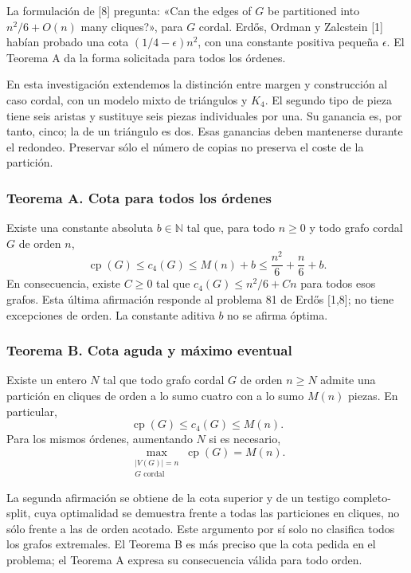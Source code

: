 \documentclass[spanish,11pt,a4paper]{article}
\begin{document}
La formulación de {[}8{]} pregunta: «Can the edges of \(G\) be partitioned into \(n^2/6+O(n)\) many cliques?», para \(G\) cordal. Erdős, Ordman y Zalcstein {[}1{]} habían probado una cota \((1/4-\epsilon)n^2\), con una constante positiva pequeña \(\epsilon\). El Teorema A da la forma solicitada para todos los órdenes.

En esta investigación extendemos la distinción entre margen y construcción al caso cordal, con un modelo mixto de triángulos y \(K_4\). El segundo tipo de pieza tiene seis aristas y sustituye seis piezas individuales por una. Su ganancia es, por tanto, cinco; la de un triángulo es dos. Esas ganancias deben mantenerse durante el redondeo. Preservar sólo el número de copias no preserva el coste de la partición.

\subsubsection{Teorema A. Cota para todos los órdenes}\label{teorema-a.-cota-para-todos-los-uxf3rdenes}

Existe una constante absoluta \(b\in\mathbb N\) tal que, para todo \(n\ge0\) y todo grafo cordal \(G\) de orden \(n\), \[
\operatorname{cp}(G)\le c_4(G)\le M(n)+b
\le\frac{n^2}{6}+\frac n6+b.
\tag{A}
\] En consecuencia, existe \(C\ge0\) tal que \(c_4(G)\le n^2/6+Cn\) para todos esos grafos. Esta última afirmación responde al problema 81 de Erdős {[}1,8{]}; no tiene excepciones de orden. La constante aditiva \(b\) no se afirma óptima.

\subsubsection{Teorema B. Cota aguda y máximo eventual}\label{teorema-b.-cota-aguda-y-muxe1ximo-eventual}

Existe un entero \(N\) tal que todo grafo cordal \(G\) de orden \(n\ge N\) admite una partición en cliques de orden a lo sumo cuatro con a lo sumo \(M(n)\) piezas. En particular, \[
\operatorname{cp}(G)\le c_4(G)\le M(n).
\tag{1.1}
\] Para los mismos órdenes, aumentando \(N\) si es necesario, \[
\max_{\substack{|V(G)|=n\\G\text{ cordal}}}\operatorname{cp}(G)=M(n).
\tag{1.2}
\]

La segunda afirmación se obtiene de la cota superior y de un testigo completo-split, cuya optimalidad se demuestra frente a todas las particiones en cliques, no sólo frente a las de orden acotado. Este argumento por sí solo no clasifica todos los grafos extremales. El Teorema B es más preciso que la cota pedida en el problema; el Teorema A expresa su consecuencia válida para todo orden.
\end{document}
